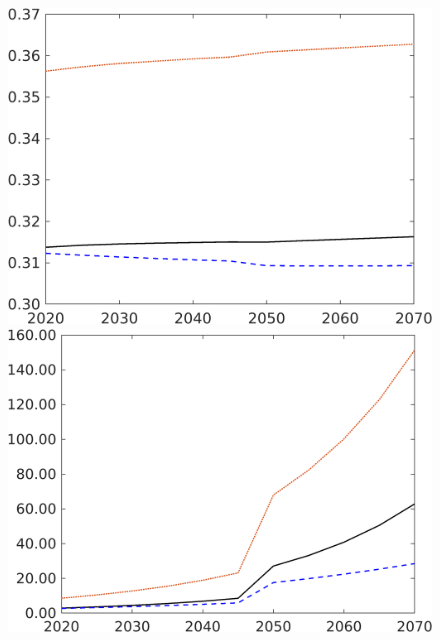 \begin{figure}[h!!]
\begin{minipage}[]{0.32\textwidth}
 	\end{minipage}
 	\begin{minipage}[]{0.32\textwidth}
 		\includegraphics[width=1\textwidth]{../../codding_model/own_basedOnFried/optimalPol_190722_tidiedUp/figures/all_10Aout22/EFF_CompMod_OPT_T_NoTaus_hl_regime3_spillover0_noskill0_sep1_xgrowth0_extern0_PV1_etaa0.79_lgd0.png}
 	\end{minipage}
 	\begin{minipage}[]{0.32\textwidth}
 		\includegraphics[width=1\textwidth]{../../codding_model/own_basedOnFried/optimalPol_190722_tidiedUp/figures/all_10Aout22/EFF_CompMod_OPT_T_NoTaus_GFF_regime3_spillover0_noskill0_sep1_xgrowth0_extern0_PV1_etaa0.79_lgd0.png}
 	\end{minipage}
 \end{figure}
